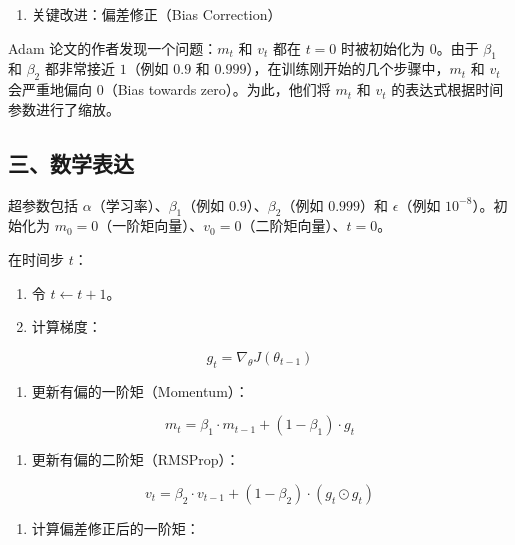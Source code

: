 \begin{enumerate}
\def\labelenumi{\arabic{enumi}.}
\setcounter{enumi}{1}
\tightlist
\item
  关键改进：偏差修正（Bias Correction）
\end{enumerate}

Adam 论文的作者发现一个问题：\(m_t\) 和 \(v_t\) 都在 \(t=0\) 时被初始化为 \(0\)。由于 \(\beta_1\) 和 \(\beta_2\) 都非常接近 \(1\)（例如 \(0.9\) 和 \(0.999\)），在训练刚开始的几个步骤中，\(m_t\) 和 \(v_t\) 会严重地偏向 \(0\)（Bias towards zero）。为此，他们将 \(m_t\) 和 \(v_t\) 的表达式根据时间参数进行了缩放。

\hypertarget{ux4e09ux6570ux5b66ux8868ux8fbe-2}{%
\subsection{三、数学表达}\label{ux4e09ux6570ux5b66ux8868ux8fbe-2}}

超参数包括 \(\alpha\)（学习率）、\(\beta_1\)（例如 \(0.9\)）、\(\beta_2\)（例如 \(0.999\)）和 \(\epsilon\)（例如 \(10^{-8}\)）。初始化为 \(m_0=0\)（一阶矩向量）、\(v_0=0\)（二阶矩向量）、\(t=0\)。

在时间步 \(t\)：

\begin{enumerate}
\def\labelenumi{\arabic{enumi}.}
\tightlist
\item
  令 \(t \leftarrow t+1\)。
\item
  计算梯度：
\end{enumerate}

\[
g_t = \nabla_\theta J(\theta_{t-1})
\]

\begin{enumerate}
\def\labelenumi{\arabic{enumi}.}
\setcounter{enumi}{2}
\tightlist
\item
  更新有偏的一阶矩（Momentum）：
\end{enumerate}

\[
m_t = \beta_1 \cdot m_{t-1} + (1-\beta_1)\cdot g_t
\]

\begin{enumerate}
\def\labelenumi{\arabic{enumi}.}
\setcounter{enumi}{3}
\tightlist
\item
  更新有偏的二阶矩（RMSProp）：
\end{enumerate}

\[
v_t = \beta_2 \cdot v_{t-1} + (1-\beta_2)\cdot (g_t \odot g_t)
\]

\begin{enumerate}
\def\labelenumi{\arabic{enumi}.}
\setcounter{enumi}{4}
\tightlist
\item
  计算偏差修正后的一阶矩：
\end{enumerate}

